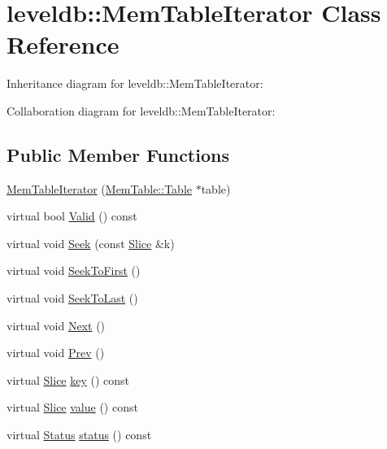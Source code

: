 \hypertarget{classleveldb_1_1_mem_table_iterator}{\section{leveldb\-:\-:Mem\-Table\-Iterator Class Reference}
\label{classleveldb_1_1_mem_table_iterator}
}


Inheritance diagram for leveldb\-:\-:Mem\-Table\-Iterator\-:


Collaboration diagram for leveldb\-:\-:Mem\-Table\-Iterator\-:
\subsection*{Public Member Functions}
\begin{DoxyCompactItemize}
\item 
\hyperlink{classleveldb_1_1_mem_table_iterator_a3cf243a6e8166d55ce87081f69a5ecd7}{Mem\-Table\-Iterator} (\hyperlink{classleveldb_1_1_mem_table_af42bc32bc4c20aea12fc647ee41df058}{Mem\-Table\-::\-Table} $\ast$table)
\item 
virtual bool \hyperlink{classleveldb_1_1_mem_table_iterator_a95a8909aa37acb52f85a88c97329fa11}{Valid} () const 
\item 
virtual void \hyperlink{classleveldb_1_1_mem_table_iterator_a140f9575286994337de9b49ea7fe62cb}{Seek} (const \hyperlink{classleveldb_1_1_slice}{Slice} \&k)
\item 
virtual void \hyperlink{classleveldb_1_1_mem_table_iterator_a72eaf5c1bcb6d513f71d4edcb8db3f98}{Seek\-To\-First} ()
\item 
virtual void \hyperlink{classleveldb_1_1_mem_table_iterator_aaed044dc887a51c924086f2a2844a5f0}{Seek\-To\-Last} ()
\item 
virtual void \hyperlink{classleveldb_1_1_mem_table_iterator_a8ce5457cf61b989ce1ceec80084f891c}{Next} ()
\item 
virtual void \hyperlink{classleveldb_1_1_mem_table_iterator_a61f8a385b268158a1e7bd0cba29a83c1}{Prev} ()
\item 
virtual \hyperlink{classleveldb_1_1_slice}{Slice} \hyperlink{classleveldb_1_1_mem_table_iterator_a3e9b1c478d4ba8747dae4c8acb77a289}{key} () const 
\item 
virtual \hyperlink{classleveldb_1_1_slice}{Slice} \hyperlink{classleveldb_1_1_mem_table_iterator_a5910c8d44980cdec2d8ba603aabb98b8}{value} () const 
\item 
virtual \hyperlink{classleveldb_1_1_status}{Status} \hyperlink{classleveldb_1_1_mem_table_iterator_a1669aab641ff394968c30581a6b63f2a}{status} () const 
\end{DoxyCompactItemize}
